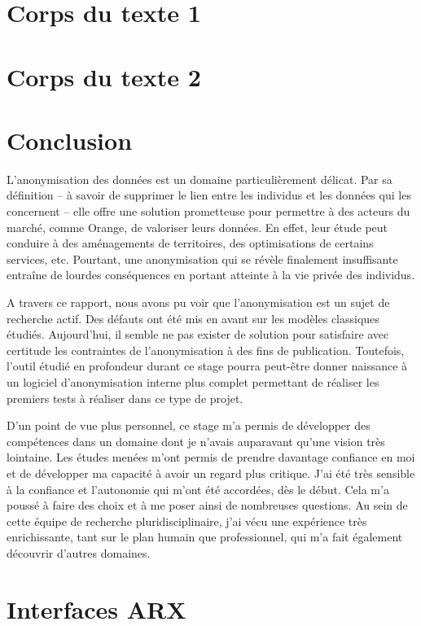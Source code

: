 \documentclass[11pt,oneside]{book}
\begin{document}
	\chapter{Corps du texte 1}
	
	\chapter{Corps du texte 2}


	\chapter*{Conclusion}  %
	
		L'anonymisation des données est un domaine particulièrement délicat. Par sa définition -- à savoir de supprimer le lien entre les individus et les données qui les concernent -- elle offre une solution prometteuse pour permettre à des acteurs du marché, comme Orange, de valoriser leurs données. En effet, leur étude peut conduire à des aménagements de territoires, des optimisations de certains services, etc. Pourtant, une anonymisation qui se révèle finalement insuffisante entraîne de lourdes conséquences en portant atteinte à la vie privée des individus.
		
		\medskip
		
		A travers ce rapport, nous avons pu voir que l'anonymisation est un sujet de recherche actif. Des défauts ont été mis en avant sur les modèles classiques étudiés. Aujourd'hui, il semble ne pas exister de solution pour satisfaire avec certitude les contraintes de l'anonymisation à des fins de publication. Toutefois, l'outil étudié en profondeur durant ce stage pourra peut-être donner naissance à un logiciel d'anonymisation interne plus complet permettant de réaliser les premiers tests à réaliser dans ce type de projet.
		
		\bigskip 
		
		D'un point de vue plus personnel, ce stage m'a permis de développer des compétences dans un domaine dont je n'avais auparavant qu'une vision très lointaine. Les études menées m'ont permis de prendre davantage confiance en moi et de développer ma capacité à avoir un regard plus critique. J'ai été très sensible à la confiance et l'autonomie qui m'ont été accordées, dès le début. Cela m'a poussé à faire des choix et à me poser ainsi de nombreuses questions. Au sein de cette équipe de recherche pluridisciplinaire, j'ai vécu une expérience très enrichissante, tant sur le plan humain que professionnel, qui m'a fait également découvrir d'autres domaines.
		
	
	
	

	\appendix
	
	\chapter{Interfaces ARX}
	
\end{document}
